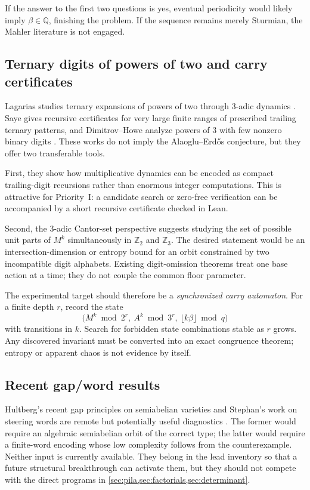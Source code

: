 \documentclass[10pt,letterpaper]{article}
\newcommand{\Q}{\mathbb Q}
\newcommand{\Z}{\mathbb Z}
\begin{document}
If the answer to the first two questions is yes, eventual periodicity would likely imply
\(\beta\in\Q\), finishing the problem.  If the sequence remains merely Sturmian, the Mahler
literature is not engaged.

\subsection{Ternary digits of powers of two and carry certificates}

Lagarias studies ternary expansions of powers of two through \(3\)-adic dynamics
\cite{Lagarias2009}.  Saye gives recursive certificates for very large finite ranges of
prescribed trailing ternary patterns, and Dimitrov--Howe analyze powers of \(3\) with few
nonzero binary digits \cite{Saye2022,DimitrovHowe}.  These works do not imply the
Alaoglu--Erd\H{o}s conjecture, but they offer two transferable tools.

First, they show how multiplicative dynamics can be encoded as compact trailing-digit
recursions rather than enormous integer computations.  This is attractive for Priority~I:
a candidate search or zero-free verification can be accompanied by a short recursive
certificate checked in Lean.

Second, the \(3\)-adic Cantor-set perspective suggests studying the set of possible unit
parts of \(M^k\) simultaneously in \(\Z_2\) and \(\Z_3\).  The desired statement would be an
intersection-dimension or entropy bound for an orbit constrained by two incompatible digit
alphabets.  Existing digit-omission theorems treat one base action at a time; they do not
couple the common floor parameter.

The experimental target should therefore be a \emph{synchronized carry automaton}.  For a
finite depth \(r\), record the state
\[
  \bigl(M^k\bmod 2^r,\ A^k\bmod3^r,\ \lfloor k\beta\rfloor\bmod q\bigr)
\]
with transitions in \(k\).  Search for forbidden state combinations stable as \(r\) grows.
Any discovered invariant must be converted into an exact congruence theorem; entropy or
apparent chaos is not evidence by itself.

\subsection{Recent gap/word results}

Hultberg's recent gap principles on semiabelian varieties and Stephan's work on steering
words are remote but potentially useful diagnostics \cite{Hultberg2026,Stephan2026}.  The
former would require an algebraic semiabelian orbit of the correct type; the latter would
require a finite-word encoding whose low complexity follows from the counterexample.  Neither
input is currently available.  They belong in the lead inventory so that a future structural
breakthrough can activate them, but they should not compete with the direct programs in
\cref{sec:pila,sec:factorials,sec:determinant}.
\end{document}
